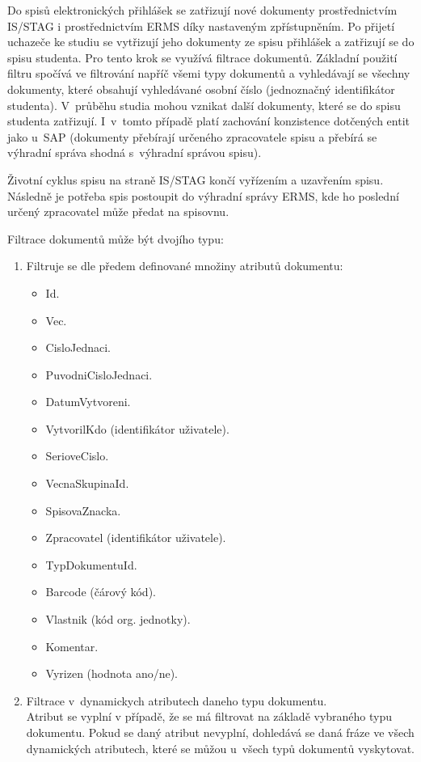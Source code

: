 \documentclass[
  master,
  field=ainfp,
  biblatex,
  language=czech,
  glossaries,
  theorems=false,
  index
]{kidiplom}
\begin{document}
Do spisů elektronických přihlášek se zatřizují nové dokumenty prostřednictvím IS/STAG i prostřednictvím ERMS díky nastaveným zpřístupněním. Po přijetí uchazeče ke studiu se vytřizují jeho dokumenty ze spisu přihlášek a zatřizují se do spisu studenta. Pro tento krok se využívá filtrace dokumentů. Základní použití filtru spočívá ve filtrování napříč všemi typy dokumentů a vyhledávají se všechny dokumenty, které obsahují vyhledávané osobní číslo (jednoznačný identifikátor studenta). V~průběhu studia mohou vznikat další dokumenty, které se do spisu studenta zatřizují. I~v~tomto případě platí zachování konzistence dotčených entit jako u~SAP (dokumenty přebírají určeného zpracovatele spisu a přebírá se výhradní správa shodná s~výhradní správou spisu).

Životní cyklus spisu na straně IS/STAG končí vyřízením a uzavřením spisu. Následně je potřeba spis postoupit do výhradní správy ERMS, kde ho poslední určený zpracovatel může předat na spisovnu.
 
Filtrace dokumentů může být dvojího typu:
\begin{enumerate}
	\item Filtruje se dle předem definované množiny atributů dokumentu:
	\begin{itemize}
		\item Id.
		\item Vec.
		\item CisloJednaci.
		\item PuvodniCisloJednaci.
		\item DatumVytvoreni.
		\item VytvorilKdo (identifikátor uživatele).
		\item SerioveCislo.
		\item VecnaSkupinaId.
		\item SpisovaZnacka.
		\item Zpracovatel (identifikátor uživatele).
		\item TypDokumentuId.
		\item Barcode (čárový kód).
		\item Vlastnik (kód org. jednotky).
		\item Komentar.
		\item Vyrizen (hodnota ano/ne).
	\end{itemize}
	\item Filtrace v~dynamickych atributech daneho typu dokumentu.\\
	Atribut  se vyplní v případě, že se má filtrovat na základě vybraného typu dokumentu. Pokud se daný atribut nevyplní, dohledává se daná fráze ve všech dynamických atributech, které se můžou u~všech typů dokumentů vyskytovat.
\end{enumerate}  
\end{document}
